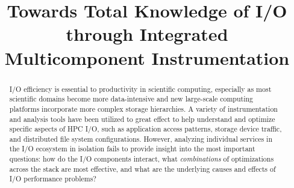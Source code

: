 \documentclass[conference,10pt,compsocconf]{IEEEtran}
\begin{document}
\title{Towards Total Knowledge of I/O through Integrated Multicomponent Instrumentation}

\maketitle

\begin{abstract}
%
%

I/O efficiency is essential to productivity in scientific computing,
especially as most scientific domains become more data-intensive and
new large-scale computing platforms incorporate more complex storage
hierarchies.  A variety of instrumentation and analysis tools have been
utilized to great effect to help understand and optimize specific aspects of
HPC I/O, such as application access patterns, storage device traffic, and
distributed file system configurations.  However, analyzing individual services in the
I/O ecosystem in isolation fails to provide insight into the most important
questions: how do the I/O components interact, what \emph{combinations}
of optimizations across the stack are most effective, and what are the
underlying causes and effects of I/O performance problems?


\end{abstract}
\end{document}
